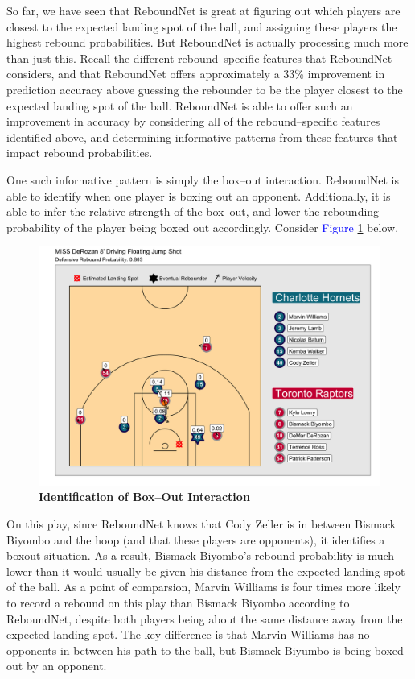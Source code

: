 \documentclass{article}
\begin{document}
\bigbreak
\noindent
So far, we have seen that ReboundNet is great at figuring out which players are closest to the expected landing spot of the ball, and assigning these players the highest rebound probabilities. But ReboundNet is actually processing much more than just this. Recall the different rebound--specific features that ReboundNet considers, and that ReboundNet offers approximately a 33\% improvement in prediction accuracy above guessing the rebounder to be the player closest to the expected landing spot of the ball. ReboundNet is able to offer such an improvement in accuracy by considering all of the rebound--specific features identified above, and determining informative patterns from these features that impact rebound probabilities.

\bigbreak
\noindent
One such informative pattern is simply the box--out interaction. ReboundNet is able to identify when one player is boxing out an opponent. Additionally, it is able to infer the relative strength of the box--out, and lower the rebounding probability of the player being boxed out accordingly. Consider \textcolor{blue}{Figure} \ref{fig:BoxOutEx} below.

\begin{figure}[htb]
\centering
\includegraphics[width=1\columnwidth]{BoxOutEx.png}
\caption{\bf{Identification of Box--Out Interaction}}
\label{fig:BoxOutEx}
\end{figure}

\noindent
On this play, since ReboundNet knows that Cody Zeller is in between Bismack Biyombo and the hoop (and that these players are opponents), it identifies a boxout situation. As a result, Bismack Biyombo's rebound probability is much lower than it would usually be given his distance from the expected landing spot of the ball. As a point of comparsion, Marvin Williams is four times more likely to record a rebound on this play than Bismack Biyombo according to ReboundNet, despite both players being about the same distance away from the expected landing spot. The key difference is that Marvin Williams has no opponents in between his path to the ball, but Bismack Biyumbo is being boxed out by an opponent.
\end{document}

